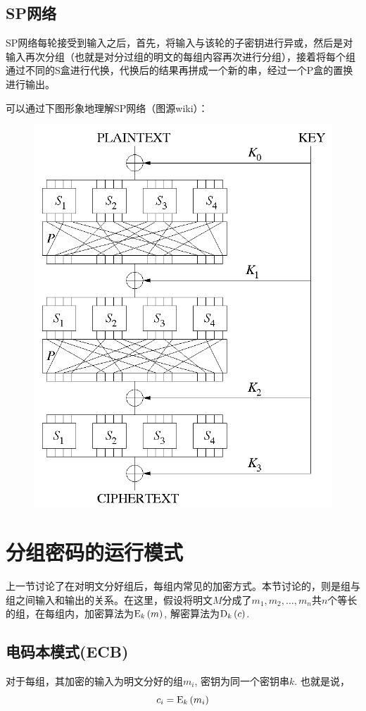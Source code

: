 \subsection{SP网络}
SP网络每轮接受到输入之后，首先，将输入与该轮的子密钥进行异或，然后是对输入再次分组（也就是对分过组的明文的每组内容再次进行分组），接着将每个组通过不同的S盒进行代换，代换后的结果再拼成一个新的串，经过一个P盒的置换进行输出。\par
可以通过下图形象地理解SP网络（图源wiki）：
\begin{figure}[H]
    \centering
    \includegraphics[scale=0.5]{SPN.png}
\end{figure}
\section{分组密码的运行模式}
上一节讨论了在对明文分好组后，每组内常见的加密方式。本节讨论的，则是组与组之间输入和输出的关系。在这里，假设将明文$M$分成了$m_1, m_2, \ldots, m_n$共$n$个等长的组，在每组内，加密算法为${\mathrm{E}_{k}\left({m}\right)}$, 解密算法为${\mathrm{D}_{k}\left({c}\right)}$.
\subsection{电码本模式(ECB)}
对于每组，其加密的输入为明文分好的组$m_i$, 密钥为同一个密钥串$k$. 也就是说，
\begin{equation}
c_i={\mathrm{E}_{k}\left({m_i}\right)}
\end{equation}

